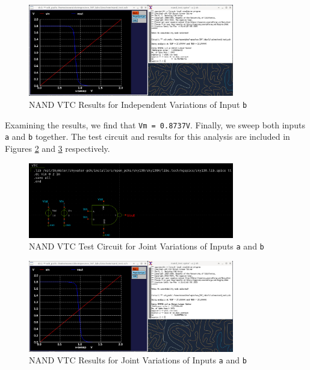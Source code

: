 \documentclass[fleqn]{article}
\begin{document}
	\begin{figure}[H]
		\centerline{\includegraphics[width=0.8\textwidth]{nand_vtc_sweep_vb.png}}
		\caption{NAND VTC Results for Independent Variations of Input \texttt{b}}
		\label{fig::nand_vtc_sweep_vb}
	\end{figure}
	
	Examining the results, we find that \texttt{Vm = 0.8737V}. Finally, we sweep both inputs \texttt{a} and \texttt{b} together. The test circuit and results for this analysis are included in Figures \ref{fig::nand_vtc_test_sweep_va_vb} and \ref{fig::nand_vtc_sweep_va_vb} respectively.
	
	\begin{figure}[H]
		\centerline{\includegraphics[width=0.8\textwidth]{nand_vtc_test_sweep_va_vb.png}}
		\caption{NAND VTC Test Circuit for Joint Variations of Inputs \texttt{a} and \texttt{b}}
		\label{fig::nand_vtc_test_sweep_va_vb}
	\end{figure}
	
	\begin{figure}[H]
		\centerline{\includegraphics[width=0.8\textwidth]{nand_vtc_sweep_va_vb.png}}
		\caption{NAND VTC Results for Joint Variations of Inputs \texttt{a} and \texttt{b}}
		\label{fig::nand_vtc_sweep_va_vb}
	\end{figure}
	
\end{document}
